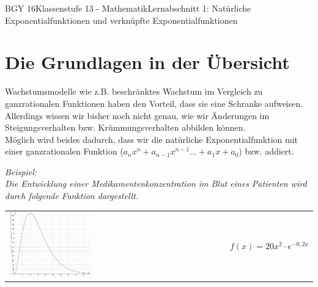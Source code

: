 \documentclass[11pt,twocolumn,oneside,openany,headings=optiontotoc,11pt,numbers=noenddot]{article}
\begin{document}
	\begin{worksheet}{BGY 16}{Klassenstufe 13 - Mathematik}{Lernabschnitt 1: Natürliche Exponentialfunktionen und verknüpfte Exponentialfunktionen}
		
		\section{Die Grundlagen in der Übersicht}
		Wachstumsmodelle wie z.B. \glqq{}beschränktes Wachstum\grqq{} im Vergleich zu ganzrationalen Funktionen haben den Vorteil, dass sie eine Schranke aufweisen.\\
		Allerdings wissen wir bisher noch nicht genau, wie wir Änderungen im Steigungsverhalten bzw. Krümmungsverhalten abbilden können.\\
		Möglich wird beides dadurch, dass wir die natürliche Exponentialfunktion mit einer ganzrationalen Funktion (\(a_nx^n + a_{n-1}x^{n-1}\ldots{}+a_1x + a_0\)) bzw. addiert.\\
		\par\noindent
		\textit{Beispiel:}\\
		\textit{Die Entwicklung einer Medikamentenkonzentration im Blut eines Patienten wird durch folgende Funktion dargestellt.}\\
		\par\noindent
		\begin{tabularx}{0.48\textwidth}{Xl}
			\includegraphics[width=0.38\textwidth,align=c]{../99_Bilder/01_ExpFkt/BspSkript_01.jpg} & \(f(x) = 20x^2\cdot{}e^{-0,2x}\)
		\end{tabularx}\\

\end{worksheet}
\end{document}
